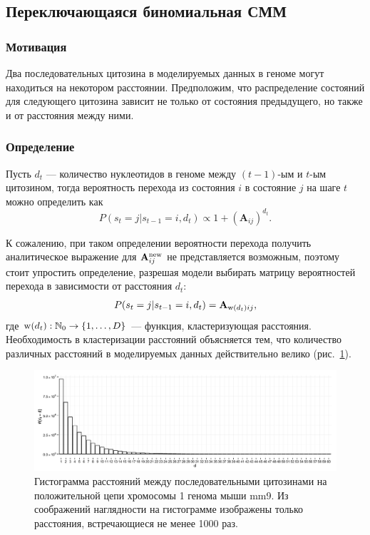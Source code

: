 \subsection{Переключающаяся биномиальная СММ}

\subsubsection{Мотивация}

Два последовательных цитозина в моделируемых данных в геноме могут находиться
на некотором расстоянии. Предположим, что распределение состояний для следующего
цитозина зависит не только от состояния предыдущего, но также и от расстояния между
ними.

\subsubsection{Определение}

Пусть $d_t$ --- количество нуклеотидов в геноме между $(t-1)$-ым и $t$-ым цитозином,
тогда вероятность перехода из состояния $i$ в состояние $j$ на шаге $t$ можно
определить как
$$
P(s_t = j|s_{t-1} = i, d_t) \propto 1 + \left( \mathbf{A}_{ij} \right)^{d_t}.
$$

К сожалению, при таком определении вероятности перехода получить аналитическое
выражение для $\mathbf{A}_{ij}^{\operatorname{new}}$ не представляется возможным, поэтому
стоит упростить определение, разрешая модели выбирать матрицу вероятностей
перехода в зависимости от расстояния $d_t$:
$$
P(s_t = j|s_{t-1} = i, d_t) = \mathbf{A}_{\operatorname{w}(d_t)ij},
$$
где $\operatorname{w}(d_t) : \mathbb{N}_0 \to \{1, \ldots, D\}$ --- функция,
кластеризующая расстояния. Необходимость в кластеризации расстояний объясняется тем, что
количество различных расстояний в моделируемых данных действительно велико
(рис.~\ref{fig:cytosine-distance}).

\begin{figure}[h!]
  \centering
  \includegraphics[width=\textwidth]{images/distance_distribution}
  \caption{Гистограмма расстояний между последовательными цитозинами на положительной
    цепи хромосомы 1 генома мыши mm9. Из соображений наглядности на гистограмме изображены
    только расстояния, встречающиеся не менее 1000 раз.}
  \label{fig:cytosine-distance}
\end{figure}

